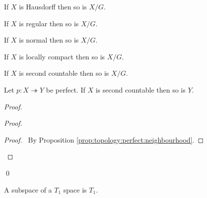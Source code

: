 \begin{cor}
 If $X$ is Hausdorff then so is $X / G$.
\end{cor}

\begin{cor}
 If $X$ is regular then so is $X / G$.
\end{cor}

\begin{cor}
 If $X$ is normal then so is $X / G$.
\end{cor}

\begin{cor}
  If $X$ is locally compact then so is $X / G$.
\end{cor}

\begin{cor}
 If $X$ is second countable then so is $X / G$.
\end{cor}

\begin{prop}
  \label{prop:topology:second_countable:perfect}
 Let $p : X \twoheadrightarrow Y$ be perfect. If $X$ is second countable then
so is $Y$.
\end{prop}

\begin{proof}
 \pf
 \begin{proof}
   \begin{proof}
     \pf\ By Proposition \ref{prop:topology:perfect:neighbourhood}.
   \end{proof}
 \end{proof}
 \qed
\end{proof}

\begin{prop}
 A subspace of a $T_1$ space is $T_1$.
\end{prop}

